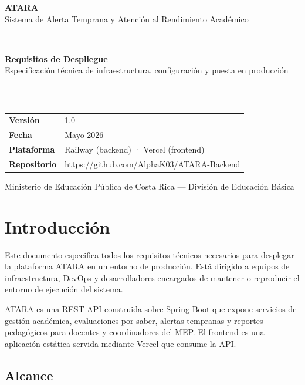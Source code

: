 \documentclass[11pt, a4paper]{article}
\begin{document}
\begin{titlepage}
  \centering
  \vspace*{3cm}
  {\huge\bfseries ATARA}\\[0.4cm]
  {\Large Sistema de Alerta Temprana y Atención al Rendimiento Académico}\\[1.2cm]
  \rule{0.6\linewidth}{1pt}\\[0.6cm]
  {\LARGE\bfseries Requisitos de Despliegue}\\[0.4cm]
  {\large Especificación técnica de infraestructura, configuración y puesta en producción}\\[0.6cm]
  \rule{0.6\linewidth}{1pt}\\[1.8cm]
  \begin{tabular}{ll}
    \textbf{Versión}     & 1.0 \\[4pt]
    \textbf{Fecha}       & Mayo 2026 \\[4pt]
    \textbf{Plataforma}  & Railway (backend) · Vercel (frontend) \\[4pt]
    \textbf{Repositorio} & \url{https://github.com/AlphaK03/ATARA-Backend} \\
  \end{tabular}
  \vfill
  {\small Ministerio de Educación Pública de Costa Rica --- División de Educación Básica}
\end{titlepage}

\tableofcontents
\newpage

\section{Introducción}

Este documento especifica todos los requisitos técnicos necesarios para desplegar la plataforma ATARA en un entorno de producción. Está dirigido a equipos de infraestructura, DevOps y desarrolladores encargados de mantener o reproducir el entorno de ejecución del sistema.

ATARA es una REST API construida sobre Spring Boot que expone servicios de gestión académica, evaluaciones por saber, alertas tempranas y reportes pedagógicos para docentes y coordinadores del MEP. El frontend es una aplicación estática servida mediante Vercel que consume la API.

\subsection{Alcance}
\end{document}
